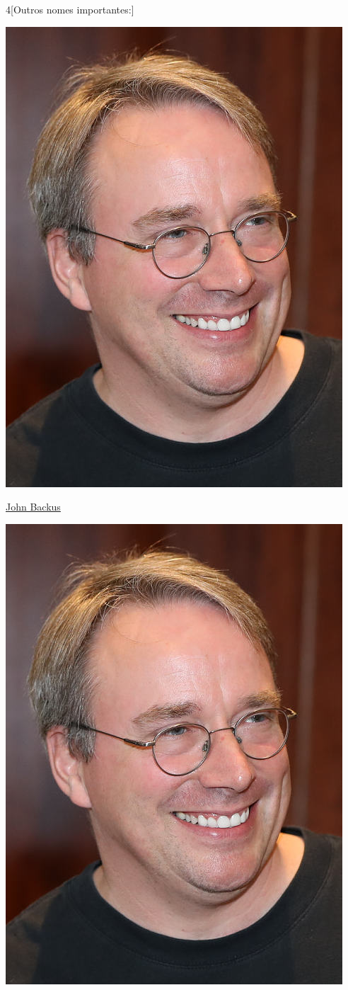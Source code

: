 \begin{multicols}{4}[Outros nomes importantes:]
\begin{center}
	\includegraphics[width=.8\columnwidth]{./IMG-GIT/CIENTISTAS/linus.jpeg}
\end{center}
				    
\vfill\null
\columnbreak				    
				    
				\href{https://pt.wikipedia.org/wiki/John_Backus}{John Backus}
				
\begin{center}
					\includegraphics[width=.8\columnwidth]{./IMG-GIT/CIENTISTAS/linus.jpeg}
\end{center}
				

\end{multicols}
